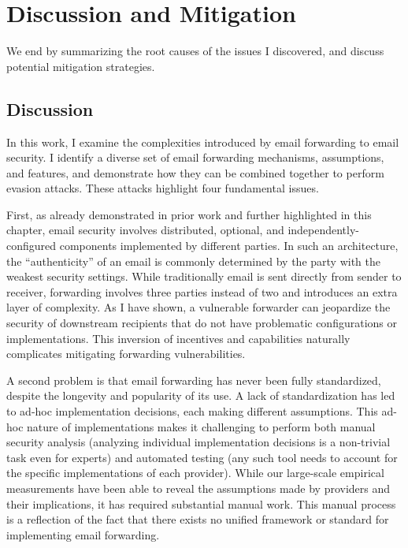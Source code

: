 \section{Discussion and Mitigation}
We end by summarizing the root causes of the issues I discovered, and discuss potential mitigation strategies.

\subsection{Discussion}
In this work, I examine the complexities introduced by email forwarding to email security. I identify a diverse set of email forwarding mechanisms, assumptions, and features, and demonstrate how they can be combined together to perform evasion attacks. These attacks highlight four fundamental issues.

First, as already demonstrated in prior work and further highlighted in this chapter, email security involves distributed, optional, and independently-configured components implemented by different parties. In such an architecture, the
``authenticity'' of an email is commonly determined by the party with the weakest security settings. While traditionally email is sent directly from sender to receiver, forwarding involves three parties instead of two and introduces an extra layer of complexity. As I have shown, a vulnerable forwarder can jeopardize the security of downstream recipients that do not have problematic configurations or implementations. This inversion of
incentives and capabilities naturally complicates
mitigating forwarding vulnerabilities.

A second problem is that email forwarding has never been fully standardized, despite the longevity and popularity of its use. A lack of standardization has led to ad-hoc implementation decisions, each making different assumptions.
This ad-hoc nature of implementations makes it challenging to perform both manual security analysis (analyzing individual implementation decisions is a non-trivial task even for experts) and automated testing (any such tool needs to account for the specific implementations of each provider).
While our large-scale empirical measurements have been able to reveal
the assumptions made by providers and their implications, it has
required substantial manual work.  This manual process is a reflection
of the fact that there exists no unified framework or standard for
implementing email forwarding.


